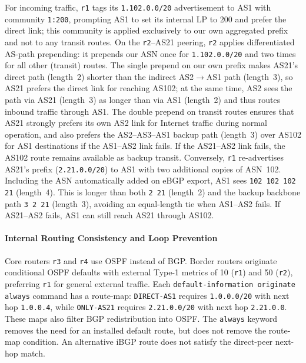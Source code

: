 \documentclass{article}
\begin{document}
For incoming traffic, \texttt{r1} tags its \texttt{1.102.0.0/20} advertisement to AS1 with community \texttt{1:200}, prompting AS1 to set its internal LP to 200 and prefer the direct link; this community is applied exclusively to our own aggregated prefix and not to any transit routes. On the \texttt{r2}--AS21 peering, \texttt{r2} applies differentiated AS-path prepending: it prepends our ASN once for \texttt{1.102.0.0/20} and two times for all other (transit) routes. The single prepend on our own prefix makes AS21's direct path (length~2) shorter than the indirect AS2$\to$AS1 path (length~3), so AS21 prefers the direct link for reaching AS102; at the same time, AS2 sees the path via AS21 (length~3) as longer than via AS1 (length~2) and thus routes inbound traffic through AS1. The double prepend on transit routes ensures that AS21 strongly prefers its own AS2 link for Internet traffic during normal operation, and also prefers the AS2--AS3--AS1 backup path (length~3) over AS102 for AS1 destinations if the AS1--AS2 link fails. If the AS21--AS2 link fails, the AS102 route remains available as backup transit. Conversely, \texttt{r1} re-advertises AS21's prefix (\texttt{2.21.0.0/20}) to AS1 with two additional copies of ASN~102. Including the ASN automatically added on eBGP export, AS1 sees \texttt{102 102 102 21} (length~4). This is longer than both \texttt{2 21} (length~2) and the backup backbone path \texttt{3 2 21} (length~3), avoiding an equal-length tie when AS1--AS2 fails. If AS21--AS2 fails, AS1 can still reach AS21 through AS102.


\paragraph{Internal Routing Consistency and Loop Prevention}
Core routers \texttt{r3} and \texttt{r4} use OSPF instead of BGP. Border routers originate conditional OSPF defaults with external Type-1 metrics of 10 (\texttt{r1}) and 50 (\texttt{r2}), preferring \texttt{r1} for general external traffic. Each \texttt{default-information originate always} command has a route-map: \texttt{DIRECT-AS1} requires \texttt{1.0.0.0/20} with next hop \texttt{1.0.0.4}, while \texttt{ONLY-AS21} requires \texttt{2.21.0.0/20} with next hop \texttt{2.21.0.0}. These maps also filter BGP redistribution into OSPF. The \texttt{always} keyword removes the need for an installed default route, but does not remove the route-map condition. An alternative iBGP route does not satisfy the direct-peer next-hop match.
\end{document}
